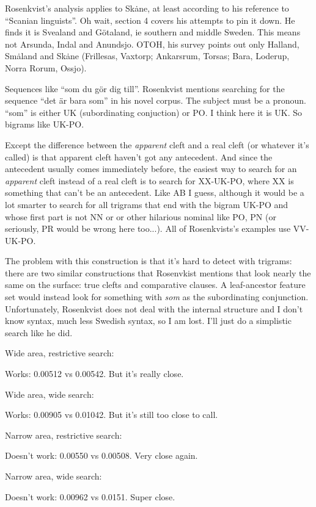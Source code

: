 Rosenkvist's analysis applies to Sk\.ane, at least according to his
reference to ``Scanian linguists''. Oh wait, section 4 covers his
attempts to pin it down. He finds it is Svealand and G\"otaland, ie
southern and middle Sweden. This means not Arsunda, Indal and
Anundsjo.
OTOH, his survey points out only Halland,
Sm\.aland and Sk\.ane (Frillesas, Vaxtorp; Ankarsrum, Torsas; Bara,
Loderup, Norra Rorum, Ossjo).

Sequences like ``som du g\"or dig till''. Rosenkvist mentions
searching for the sequence ``det \"ar bara som'' in his novel
corpus. The subject must be a pronoun. ``som'' is either UK
(subordinating conjuction) or PO. I think here it is UK. So bigrams
like UK-PO.

Except the difference between the {\it apparent} cleft and a real
cleft (or whatever it's called) is that apparent cleft haven't got any
antecedent. And since the antecedent usually comes immediately before,
the easiest way to search for an {\it apparent} cleft instead of a
real cleft is to search for XX-UK-PO, where XX is something that can't
be an antecedent. Like AB I guess, although it would be a lot smarter
to search for all trigrams that end with the bigram UK-PO and whose
first part is not NN or or other hilarious nominal like PO, PN (or
seriously, PR would be wrong here too...). All of Rosenkvists's
examples use VV-UK-PO.

The problem with this construction is that it's hard to detect with
trigrams: there are two similar constructions that Rosenvkist mentions
that look nearly the same on the surface: true clefts and comparative
clauses. A leaf-ancestor feature set would instead look for something
with {\it som} as the subordinating conjunction. Unfortunately,
Rosenkvist does not deal with the internal structure and I don't know
syntax, much less Swedish syntax, so I am lost. I'll just do a
simplistic search like he did.

Wide area, restrictive search:

Works: 0.00512 vs 0.00542. But it's really close.

Wide area, wide search:

Works: 0.00905 vs 0.01042. But it's still too close to call.

Narrow area, restrictive search:

Doesn't work: 0.00550 vs 0.00508. Very close again.

Narrow area, wide search:

Doesn't work: 0.00962 vs 0.0151. Super close.

